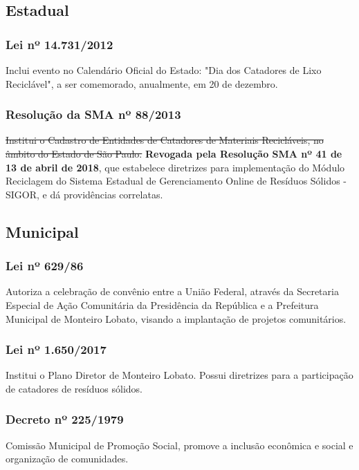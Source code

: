 \begin{subapend}
	\subsection{Estadual}
	\begin{subsubapend}
		\item \subsubsection{Lei nº 14.731/2012}
		Inclui evento no Calendário Oficial do Estado: "Dia dos Catadores de Lixo Reciclável", a ser comemorado, anualmente, em 20 de dezembro.
		\subsubsection{Resolução da SMA nº 88/2013}
		\sout{Institui o Cadastro de Entidades de Catadores de Materiais Recicláveis, no âmbito do Estado de São Paulo.}
		\textbf{Revogada pela Resolução SMA nº 41 de 13 de abril de 2018}, que estabelece diretrizes para implementação do Módulo Reciclagem do Sistema Estadual de Gerenciamento Online de Resíduos Sólidos - SIGOR, e dá providências correlatas.
		\subsection{Municipal}
		\subsubsection{Lei nº 629/86}
		Autoriza a celebração de convênio entre a União Federal, através da Secretaria Especial de Ação Comunitária da Presidência da República e a Prefeitura Municipal de Monteiro Lobato, visando a implantação de projetos comunitários.
		\subsubsection{Lei nº 1.650/2017}
		Institui o Plano Diretor de Monteiro Lobato. Possui diretrizes para a participação de catadores de resíduos sólidos.
		\subsubsection{Decreto nº 225/1979}
		Comissão Municipal de Promoção Social, promove a inclusão econômica e social e organização de comunidades.
	\end{subsubapend}
\end{subapend}

